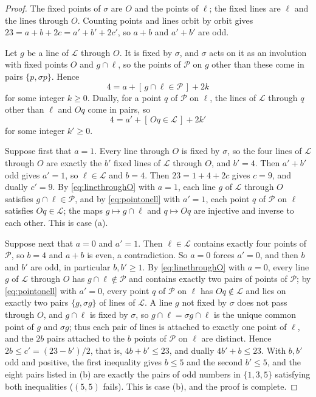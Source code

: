 \documentclass[11pt]{article}
\theoremstyle{plain}
\theoremstyle{definition}
\newcommand{\cP}{\mathcal{P}}
\newcommand{\cL}{\mathcal{L}}
\begin{document}
\begin{proof}
The fixed points of $\sigma$ are $O$ and the points of $\ell$; the fixed lines are $\ell$ and the lines through $O$.  Counting points and lines orbit by orbit gives $23=a+b+2c=a'+b'+2c'$, so $a+b$ and $a'+b'$ are odd.

Let $g$ be a line of $\cL$ through $O$.  It is fixed by $\sigma$, and $\sigma$ acts on it as an involution with fixed points $O$ and $g\cap\ell$, so the points of $\cP$ on $g$ other than these come in pairs $\{p,\sigma p\}$.  Hence
\begin{equation}\label{eq:linethroughO}
4=a+[\,g\cap\ell\in\cP\,]+2k
\end{equation}
for some integer $k\ge0$.  Dually, for a point $q$ of $\cP$ on $\ell$, the lines of $\cL$ through $q$ other than $\ell$ and $Oq$ come in pairs, so
\begin{equation}\label{eq:pointonell}
4=a'+[\,Oq\in\cL\,]+2k'
\end{equation}
for some integer $k'\ge0$.

Suppose first that $a=1$.  Every line through $O$ is fixed by $\sigma$, so the four lines of $\cL$ through $O$ are exactly the $b'$ fixed lines of $\cL$ through $O$, and $b'=4$.  Then $a'+b'$ odd gives $a'=1$, so $\ell\in\cL$ and $b=4$.  Then $23=1+4+2c$ gives $c=9$, and dually $c'=9$.  By \eqref{eq:linethroughO} with $a=1$, each line $g$ of $\cL$ through $O$ satisfies $g\cap\ell\in\cP$, and by \eqref{eq:pointonell} with $a'=1$, each point $q$ of $\cP$ on $\ell$ satisfies $Oq\in\cL$; the maps $g\mapsto g\cap\ell$ and $q\mapsto Oq$ are injective and inverse to each other.  This is case (a).

Suppose next that $a=0$ and $a'=1$.  Then $\ell\in\cL$ contains exactly four points of $\cP$, so $b=4$ and $a+b$ is even, a contradiction.  So $a=0$ forces $a'=0$, and then $b$ and $b'$ are odd, in particular $b,b'\ge1$.  By \eqref{eq:linethroughO} with $a=0$, every line $g$ of $\cL$ through $O$ has $g\cap\ell\notin\cP$ and contains exactly two pairs of points of $\cP$; by \eqref{eq:pointonell} with $a'=0$, every point $q$ of $\cP$ on $\ell$ has $Oq\notin\cL$ and lies on exactly two pairs $\{g,\sigma g\}$ of lines of $\cL$.  A line $g$ not fixed by $\sigma$ does not pass through $O$, and $g\cap\ell$ is fixed by $\sigma$, so $g\cap\ell=\sigma g\cap\ell$ is the unique common point of $g$ and $\sigma g$; thus each pair of lines is attached to exactly one point of $\ell$, and the $2b$ pairs attached to the $b$ points of $\cP$ on $\ell$ are distinct.  Hence $2b\le c'=(23-b')/2$, that is, $4b+b'\le23$, and dually $4b'+b\le23$.  With $b,b'$ odd and positive, the first inequality gives $b\le5$ and the second $b'\le5$, and the eight pairs listed in (b) are exactly the pairs of odd numbers in $\{1,3,5\}$ satisfying both inequalities ($(5,5)$ fails).  This is case (b), and the proof is complete.
\end{proof}
\end{document}
